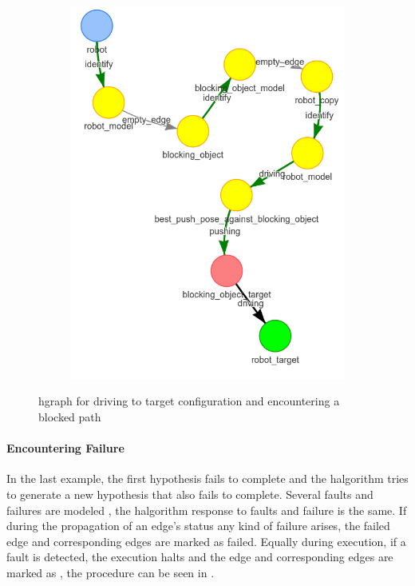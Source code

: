 \begin{figure}[H]
\begin{subfigure}{.3\textwidth}
    \caption{}\label{subfig:blocking_obj_5}
    \end{subfigure}
    \begin{subfigure}{.3\textwidth}
    \centering
    \includegraphics[width=\textwidth]{figures/proposed_method/connecting_nodes/blocking_obj/blocking_obj_6}
    \caption{}\label{subfig:blocking_obj_6}
    \end{subfigure}
    \caption{\ac{hgraph} for driving to target configuration and encountering a blocked path}%
    \label{fig:blocking_obj_hgraph}
\end{figure}

\paragraph{Encountering Failure}%
In the last example,  the first hypothesis fails to complete and the \ac{halgorithm} tries to generate a new hypothesis that also fails to complete. Several faults and failures are modeled , the \ac{halgorithm} response to faults and failure is the same. If during the propagation of an edge's status any kind of failure arises, the failed edge and corresponding edges are marked as failed. Equally during execution, if a fault is detected, the execution halts and the edge and corresponding edges are marked as , the procedure can be seen in .\bs

